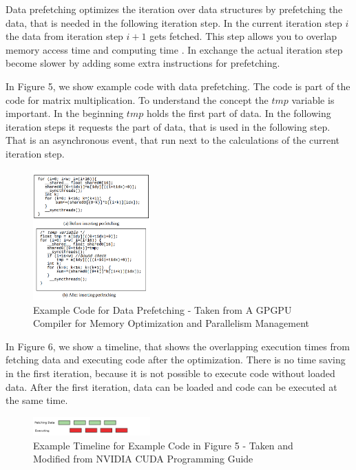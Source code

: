 \documentclass[conference]{IEEEtran}
\begin{document}
		
		Data prefetching optimizes the iteration over data structures by prefetching the data, that is needed in the following iteration step. In the current iteration step $i$ the data from iteration step $i+1$ gets fetched. This step allows you to overlap memory access time and computing time \cite{yang2010gpgpu}. In exchange the actual iteration step become slower by adding some extra instructions for prefetching.
		
		In Figure 5, we show example code with data prefetching. The code is part of the code for matrix multiplication. To understand the concept the $tmp$ variable is important. In the beginning $tmp$ holds the first part of data. In the following iteration steps it requests the part of data, that is used in the following step. That is an asynchronous event, that run next to the calculations of the current iteration step. 
		
		\begin{figure}[htbp]
			\centerline{\includegraphics[width=0.4\textwidth]{DataPrefetchingCodeExample.png}}
			\caption{Example Code for Data Prefetching - Taken from  A GPGPU Compiler for Memory Optimization and Parallelism Management}
			\label{fig2}
		\end{figure}
	
		In Figure 6, we show a timeline, that shows the overlapping execution times from fetching data and executing code after the optimization. There is no time saving in the first iteration, because it is not possible to execute code without loaded data. After the first iteration, data can be loaded and code can be executed at the same time.
		
		\begin{figure}[htbp]
			\centerline{\includegraphics[width=0.4\textwidth]{DataPrefetching.png}}
			\caption{Example Timeline for Example Code in Figure 5 - Taken and Modified from NVIDIA CUDA Programming Guide}
			\label{fig2}
		\end{figure}
		
\end{document}
